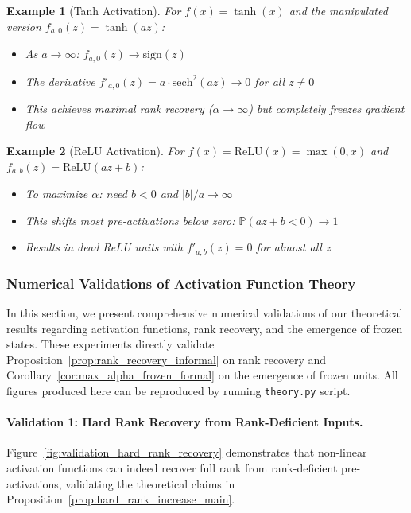 \documentclass{article}
\newtheorem{example}{Example}[section] %
\numberwithin{figure}{section}
\begin{document}
\begin{example}[Tanh Activation]
For $f(x) = \tanh(x)$ and the manipulated version $f_{a,0}(z) = \tanh(az)$:
\begin{itemize}
    \item As $a \to \infty$: $f_{a,0}(z) \to \text{sign}(z)$
    \item The derivative $f'_{a,0}(z) = a \cdot \text{sech}^2(az) \to 0$ for all $z \neq 0$
    \item This achieves maximal rank recovery ($\alpha \to \infty$) but completely freezes gradient flow
\end{itemize}
\end{example}

\begin{example}[ReLU Activation]
For $f(x) = \text{ReLU}(x) = \max(0, x)$ and $f_{a,b}(z) = \text{ReLU}(az + b)$:
\begin{itemize}
    \item To maximize $\alpha$: need $b < 0$ and $|b|/a \to \infty$
    \item This shifts most pre-activations below zero: $\mathbb{P}(az + b < 0) \to 1$
    \item Results in dead ReLU units with $f'_{a,b}(z) = 0$ for almost all $z$
\end{itemize}
\end{example}

\subsubsection{Numerical Validations of Activation Function Theory}
\label{app:numerical_validations_activations}

In this section, we present comprehensive numerical validations of our theoretical results regarding activation functions, rank recovery, and the emergence of frozen states. These experiments directly validate Proposition~\ref{prop:rank_recovery_informal} on rank recovery and Corollary~\ref{cor:max_alpha_frozen_formal} on the emergence of frozen units. All figures produced here can be reproduced by running \texttt{theory.py} script. 

\paragraph{Validation 1: Hard Rank Recovery from Rank-Deficient Inputs.}
Figure~\ref{fig:validation_hard_rank_recovery} demonstrates that non-linear activation functions can indeed recover full rank from rank-deficient pre-activations, validating the theoretical claims in Proposition~\ref{prop:hard_rank_increase_main}.
\end{document}
